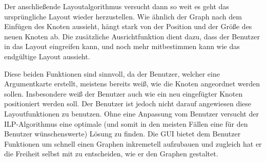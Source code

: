 Der anschließende Layoutalgorithmus versucht dann so weit es geht das ursprüngliche
Layout wieder herzustellen. Wie ähnlich der Graph nach dem Einfügen des Knoten aussieht,
hängt stark von der Position und der Größe des neuen Knoten ab. Die zusätzliche
Ausrichtfunktion dient dazu, dass der Benutzer in das Layout eingreifen kann, und noch mehr
mitbestimmen kann wie das endgültige Layout aussieht.

Diese beiden Funktionen sind sinnvoll, da der Benutzer, welcher eine Argumentkarte erstellt,
meistens bereits weiß, wie die Knoten angeordnet werden sollen. Insbesondere weiß der
Benutzer auch wie ein neu eingefügter Knoten positioniert werden soll. Der Benutzer ist
jedoch nicht darauf angewiesen diese Layoutfunktionen zu benutzen. Ohne eine Anpassung
vom Benutzer versucht der ILP-Algorithmus eine optimale (und somit in den meisten Fällen
eine für den Benutzer wünschenswerte) Lösung zu finden.
 Die GUI bietet dem Benutzer Funktionen um schnell einen Graphen inkremetell aufzubauen
und zugleich hat er die Freiheit selbst mit zu entscheiden, wie er den Graphen gestaltet.
